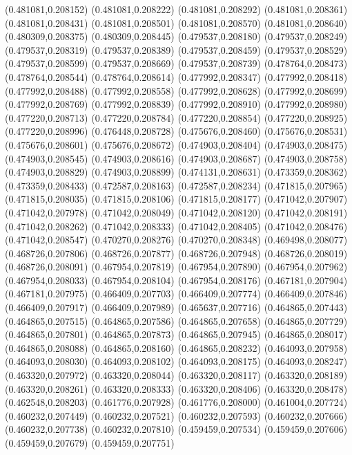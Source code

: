 (0.481081,0.208152)
(0.481081,0.208222)
(0.481081,0.208292)
(0.481081,0.208361)
(0.481081,0.208431)
(0.481081,0.208501)
(0.481081,0.208570)
(0.481081,0.208640)
(0.480309,0.208375)
(0.480309,0.208445)
(0.479537,0.208180)
(0.479537,0.208249)
(0.479537,0.208319)
(0.479537,0.208389)
(0.479537,0.208459)
(0.479537,0.208529)
(0.479537,0.208599)
(0.479537,0.208669)
(0.479537,0.208739)
(0.478764,0.208473)
(0.478764,0.208544)
(0.478764,0.208614)
(0.477992,0.208347)
(0.477992,0.208418)
(0.477992,0.208488)
(0.477992,0.208558)
(0.477992,0.208628)
(0.477992,0.208699)
(0.477992,0.208769)
(0.477992,0.208839)
(0.477992,0.208910)
(0.477992,0.208980)
(0.477220,0.208713)
(0.477220,0.208784)
(0.477220,0.208854)
(0.477220,0.208925)
(0.477220,0.208996)
(0.476448,0.208728)
(0.475676,0.208460)
(0.475676,0.208531)
(0.475676,0.208601)
(0.475676,0.208672)
(0.474903,0.208404)
(0.474903,0.208475)
(0.474903,0.208545)
(0.474903,0.208616)
(0.474903,0.208687)
(0.474903,0.208758)
(0.474903,0.208829)
(0.474903,0.208899)
(0.474131,0.208631)
(0.473359,0.208362)
(0.473359,0.208433)
(0.472587,0.208163)
(0.472587,0.208234)
(0.471815,0.207965)
(0.471815,0.208035)
(0.471815,0.208106)
(0.471815,0.208177)
(0.471042,0.207907)
(0.471042,0.207978)
(0.471042,0.208049)
(0.471042,0.208120)
(0.471042,0.208191)
(0.471042,0.208262)
(0.471042,0.208333)
(0.471042,0.208405)
(0.471042,0.208476)
(0.471042,0.208547)
(0.470270,0.208276)
(0.470270,0.208348)
(0.469498,0.208077)
(0.468726,0.207806)
(0.468726,0.207877)
(0.468726,0.207948)
(0.468726,0.208019)
(0.468726,0.208091)
(0.467954,0.207819)
(0.467954,0.207890)
(0.467954,0.207962)
(0.467954,0.208033)
(0.467954,0.208104)
(0.467954,0.208176)
(0.467181,0.207904)
(0.467181,0.207975)
(0.466409,0.207703)
(0.466409,0.207774)
(0.466409,0.207846)
(0.466409,0.207917)
(0.466409,0.207989)
(0.465637,0.207716)
(0.464865,0.207443)
(0.464865,0.207515)
(0.464865,0.207586)
(0.464865,0.207658)
(0.464865,0.207729)
(0.464865,0.207801)
(0.464865,0.207873)
(0.464865,0.207945)
(0.464865,0.208017)
(0.464865,0.208088)
(0.464865,0.208160)
(0.464865,0.208232)
(0.464093,0.207958)
(0.464093,0.208030)
(0.464093,0.208102)
(0.464093,0.208175)
(0.464093,0.208247)
(0.463320,0.207972)
(0.463320,0.208044)
(0.463320,0.208117)
(0.463320,0.208189)
(0.463320,0.208261)
(0.463320,0.208333)
(0.463320,0.208406)
(0.463320,0.208478)
(0.462548,0.208203)
(0.461776,0.207928)
(0.461776,0.208000)
(0.461004,0.207724)
(0.460232,0.207449)
(0.460232,0.207521)
(0.460232,0.207593)
(0.460232,0.207666)
(0.460232,0.207738)
(0.460232,0.207810)
(0.459459,0.207534)
(0.459459,0.207606)
(0.459459,0.207679)
(0.459459,0.207751)
